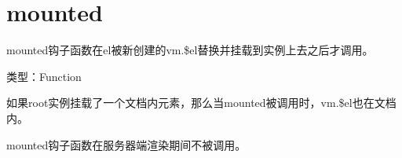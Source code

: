 \begin{lstlisting}[language=JavaScript]

\end{lstlisting}




\begin{lstlisting}[language=JavaScript]

\end{lstlisting}




\begin{lstlisting}[language=JavaScript]

\end{lstlisting}





\section{mounted}



mounted钩子函数在el被新创建的vm.\$el替换并挂载到实例上去之后才调用。



\begin{compactitem}
\item 类型：Function
\end{compactitem}

如果root实例挂载了一个文档内元素，那么当mounted被调用时，vm.\$el也在文档内。

mounted钩子函数在服务器端渲染期间不被调用。

\begin{lstlisting}[language=JavaScript]

\end{lstlisting}




\begin{lstlisting}[language=JavaScript]

\end{lstlisting}




\begin{lstlisting}[language=JavaScript]

\end{lstlisting}




\begin{lstlisting}[language=JavaScript]

\end{lstlisting}




